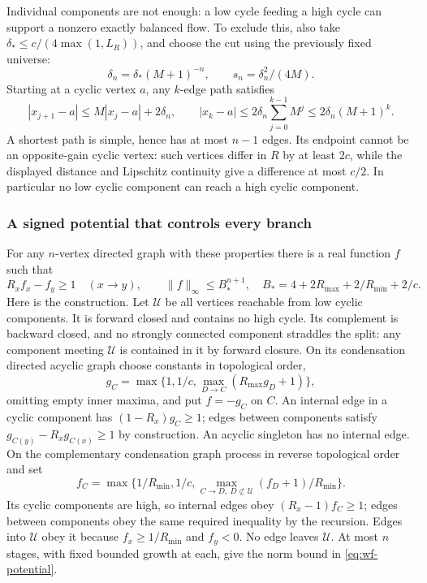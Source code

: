 Individual components are not enough: a low cycle feeding a high cycle
can support a nonzero exactly balanced flow. To exclude this, also take
$\delta_*\le c/(4\max(1,L_R))$, and choose the cut using the previously
fixed universe:
\begin{equation}\label{eq:wf-cut}
 \delta_n=\delta_*(M+1)^{-n},\qquad s_n=\delta_n^2/(4M).
\end{equation}
Starting at a cyclic vertex $a$, any $k$-edge path satisfies
\[
 |x_{j+1}-a|\le M|x_j-a|+2\delta_n,\qquad
 |x_k-a|\le2\delta_n\sum_{j=0}^{k-1}M^j
              \le2\delta_n(M+1)^k.
\]
A shortest path is simple, hence has at most $n-1$ edges. Its endpoint
cannot be an opposite-gain cyclic vertex: such vertices differ in $R$
by at least $2c$, while the displayed distance and Lipschitz continuity
give a difference at most $c/2$. In particular no low cyclic component
can reach a high cyclic component.

\subsubsection*{A signed potential that controls every branch}

For any $n$-vertex directed graph with these properties there is a real
function $f$ such that
\begin{equation}\label{eq:wf-potential}
 R_xf_x-f_y\ge1\quad(x\to y),\qquad
 \|f\|_\infty\le B_*^{n+1},\quad
 B_*=4+2R_{\max}+2/R_{\min}+2/c.
\end{equation}
Here is the construction. Let $\mathcal U$ be all vertices reachable
from low cyclic components. It is forward closed and contains no high
cycle. Its complement is backward closed, and no strongly connected
component straddles the split: any component meeting $\mathcal U$ is
contained in it by forward closure. On its condensation directed acyclic graph choose constants in
topological order,
\[
 g_C=\max\{1,1/c,\max_{D\to C}(R_{\max}g_D+1)\},
\]
omitting empty inner maxima, and put $f=-g_C$ on $C$. An internal
edge in a cyclic component has $(1-R_x)g_C\ge1$; edges between
components satisfy $g_{C(y)}-R_xg_{C(x)}\ge1$ by construction.
An acyclic singleton has no internal edge. On the complementary
condensation graph process in reverse topological order and set
\[
 f_C=\max\{1/R_{\min},1/c,
       \max_{C\to D,\ D\not\subset\mathcal U}(f_D+1)/R_{\min}\}.
\]
Its cyclic components are high, so internal edges obey
$(R_x-1)f_C\ge1$; edges between components obey the same required
inequality by the recursion. Edges into $\mathcal U$ obey it because
$f_x\ge1/R_{\min}$ and $f_y<0$. No edge leaves $\mathcal U$.
At most $n$ stages, with fixed bounded growth at each, give the norm
bound in \eqref{eq:wf-potential}.

